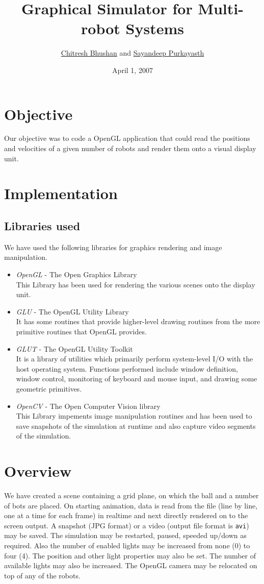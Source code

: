 \documentclass[10pt,a4paper]{article}
\begin{document}
\title{Graphical Simulator for Multi-robot Systems}
\author{\href{mailto:chitresh.bhushan@gmail.com}{Chitresh Bhushan} and \href{mailto:deepcyan@gmail.com}{Sayandeep Purkayasth}}
\date{April 1, 2007}
\maketitle
\section{Objective}
Our objective was to code a OpenGL application that could read the positions and velocities of a given number of robots and render them onto a visual display unit.
\section{Implementation}
\subsection{Libraries used}
We have used the following libraries for graphics rendering and image manipulation.
\begin{itemize}
\item \emph{OpenGL} - The Open Graphics Library \\
This Library has been used for rendering the various scenes onto the display unit.
\item \emph{GLU} - The OpenGL Utility Library \\
It has some routines that provide higher-level drawing routines from the more primitive routines that OpenGL provides.
\item \emph{GLUT} - The OpenGL Utility Toolkit \\
It is a library of utilities which primarily perform system-level I/O with the host operating system. Functions performed include window definition, window control, monitoring of keyboard and mouse input, and drawing some geometric primitives.
\item \emph{OpenCV} - The Open Computer Vision library \\
This Library impements image manipulation routines and has been used to save snapshots of the simulation at runtime and also capture video segments of the simulation.
\end{itemize}
\section{Overview}
We have created a scene containing a grid plane, on which the ball and a number of bots are placed. On starting animation, data is read from the file (line by line, one at a time for each frame) in realtime and next directly rendered on to the screen output. A snapshot (JPG format) or a video (output file format is \texttt{avi}) may be saved. The simulation may be restarted, paused, speeded up/down as required. Also the number of enabled lights may be increased from none (0) to four (4). The position and other light properties may also be set. The number of available lights may also be increased. The OpenGL camera may be relocated on top of any of the robots.
\end{document}
